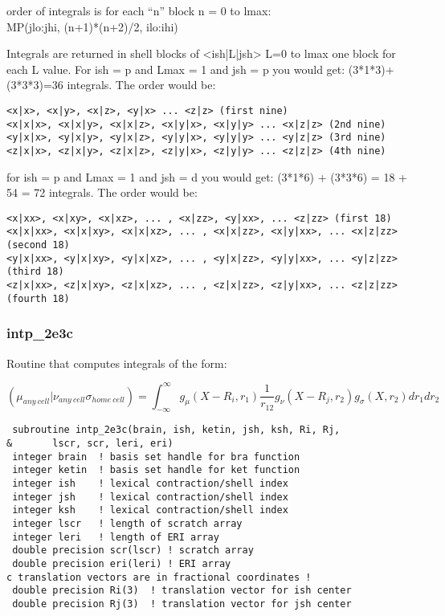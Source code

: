 order of integrals is for each ``n'' block n = 0 to lmax: \\ MP(jlo:jhi, (n+1)*(n+2)/2, ilo:ihi)

Integrals are returned in shell blocks of <ish|L|jsh> L=0 to lmax one
block for each L value.  For ish = p and Lmax = 1 and jsh = p you
would get: (3*1*3)+(3*3*3)=36 integrals. The order would be:
\begin{verbatim}
<x|x>, <x|y>, <x|z>, <y|x> ... <z|z> (first nine)
<x|x|x>, <x|x|y>, <x|x|z>, <x|y|x>, <x|y|y> ... <x|z|z> (2nd nine)
<y|x|x>, <y|x|y>, <y|x|z>, <y|y|x>, <y|y|y> ... <y|z|z> (3rd nine)
<z|x|x>, <z|x|y>, <z|x|z>, <z|y|x>, <z|y|y> ... <z|z|z> (4th nine)
\end{verbatim}

for ish = p and Lmax = 1 and jsh = d you would get: (3*1*6) + (3*3*6)
= 18 + 54 = 72 integrals. The order would be:
\begin{verbatim}
<x|xx>, <x|xy>, <x|xz>, ... , <x|zz>, <y|xx>, ... <z|zz> (first 18)
<x|x|xx>, <x|x|xy>, <x|x|xz>, ... , <x|x|zz>, <x|y|xx>, ... <x|z|zz> (second 18)
<y|x|xx>, <y|x|xy>, <y|x|xz>, ... , <y|x|zz>, <y|y|xx>, ... <y|z|zz> (third 18)
<z|x|xx>, <z|x|xy>, <z|x|xz>, ... , <z|x|zz>, <z|y|xx>, ... <z|z|zz> (fourth 18)
\end{verbatim}

\subsubsection{intp\_2e3c}
Routine that computes integrals of the form:

\[
({\mu}_{any~cell}|{\nu}_{any~cell}\sigma_{home~cell}) = \int_{-\infty}^{\infty} g_{\mu}(X-R_{i},r_{1})\frac{1}{r_{12}}g_{\nu}(X-R_{j},r_{2})g_{\sigma}(X,r_{2})dr_{1}dr_{2}
\]

\begin{verbatim}
 subroutine intp_2e3c(brain, ish, ketin, jsh, ksh, Ri, Rj, 
&       lscr, scr, leri, eri)
 integer brain  ! basis set handle for bra function
 integer ketin  ! basis set handle for ket function
 integer ish    ! lexical contraction/shell index
 integer jsh    ! lexical contraction/shell index
 integer ksh    ! lexical contraction/shell index
 integer lscr   ! length of scratch array
 integer leri   ! length of ERI array
 double precision scr(lscr) ! scratch array 
 double precision eri(leri) ! ERI array
c translation vectors are in fractional coordinates !
 double precision Ri(3)  ! translation vector for ish center 
 double precision Rj(3)  ! translation vector for jsh center 
\end{verbatim}

